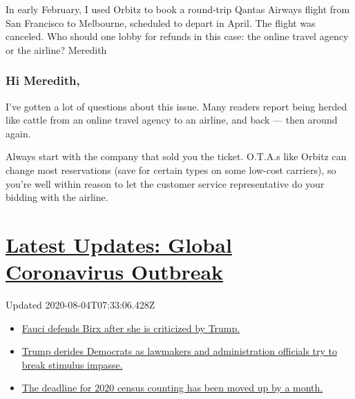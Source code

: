 In early February, I used Orbitz to book a round-trip Qantas Airways
flight from San Francisco to Melbourne, scheduled to depart in April.
The flight was canceled. Who should one lobby for refunds in this case:
the online travel agency or the airline? Meredith

\hypertarget{hi-meredith}{%
\subsubsection{Hi Meredith,}\label{hi-meredith}}

I've gotten a lot of questions about this issue. Many readers report
being herded like cattle from an online travel agency to an airline, and
back --- then around again.

Always start with the company that sold you the ticket. O.T.A.s like
Orbitz can change most reservations (save for certain types on some
low-cost carriers), so you're well within reason to let the customer
service representative do your bidding with the airline.

\hypertarget{latest-updates-global-coronavirus-outbreak}{%
\section{\texorpdfstring{\href{https://www.nytimes.com/2020/08/03/world/coronavirus-covid-19.html?action=click\&pgtype=Article\&state=default\&region=MAIN_CONTENT_1\&context=storylines_live_updates}{Latest
Updates: Global Coronavirus
Outbreak}}{Latest Updates: Global Coronavirus Outbreak}}\label{latest-updates-global-coronavirus-outbreak}}

Updated 2020-08-04T07:33:06.428Z

\begin{itemize}
\tightlist
\item
  \href{https://www.nytimes.com/2020/08/03/world/coronavirus-covid-19.html?action=click\&pgtype=Article\&state=default\&region=MAIN_CONTENT_1\&context=storylines_live_updates\#link-4547638f}{Fauci
  defends Birx after she is criticized by Trump.}
\item
  \href{https://www.nytimes.com/2020/08/03/world/coronavirus-covid-19.html?action=click\&pgtype=Article\&state=default\&region=MAIN_CONTENT_1\&context=storylines_live_updates\#link-15e7f995}{Trump
  derides Democrats as lawmakers and administration officials try to
  break stimulus impasse.}
\item
  \href{https://www.nytimes.com/2020/08/03/world/coronavirus-covid-19.html?action=click\&pgtype=Article\&state=default\&region=MAIN_CONTENT_1\&context=storylines_live_updates\#link-e5a2cda}{The
  deadline for 2020 census counting has been moved up by a month.}
\end{itemize}

